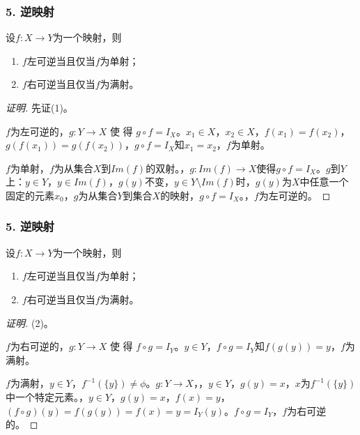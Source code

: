 \documentclass{beamer}
\begin{document}
\begin{CJK*}{UTF8}{gbsn}
\begin{frame}
  \frametitle{5. 逆映射}
  \begin{Thm}
    设$f:X\to Y$为一个映射，则
    \begin{enumerate}
    \item $f$左可逆当且仅当$f$为单射；
    \item $f$右可逆当且仅当$f$为满射。
    \end{enumerate}
  \end{Thm}\pause
  \begin{proof}[证明]\justifying\let\raggedright\justifying
  \pause  先证(1)。

$f$为左可逆的， $g:Y\to X$ 使 得 $g\circ f = I_X$。$x_1\in X$，$x_2\in X$，$f(x_1)=f(x_2)$，$g(f(x_1))=g(f(x_2))$，$g\circ f = I_{X}$知$x_1=x_2$，$f$为单射。

$f$为单射，$f$为从集合$X$到$Im(f)$的双射。，$g:Im(f)\to X$使得$g\circ f = I_X$。$g$到$Y$上：$y\in Y$，$y\in Im(f)$，$g(y)$不变，$y\in Y\setminus Im(f)$时，$g(y)$为$X$中任意一个固定的元素$x_0$，$g$为从集合$Y$到集合$X$的映射，$g\circ f = I_X$。，$f$为左可逆的。

  \end{proof}
\end{frame}
\begin{frame}
  \frametitle{5. 逆映射}
  \begin{Thm5.4}
    设$f:X\to Y$为一个映射，则
    \begin{enumerate}
    \item $f$左可逆当且仅当$f$为单射；
    \item $f$右可逆当且仅当$f$为满射。
    \end{enumerate}
  \end{Thm5.4}\pause
  \begin{proof}[证明]\justifying\let\raggedright\justifying
    (2)。

    $f$为右可逆的，$g:Y\to X$ 使 得 $f\circ g=I_Y$。$y\in Y$，$f\circ g = I_{Y}$知$f(g(y))=y$，$f$为满射。
    
    $f$为满射，$y\in Y$，\pause $f^{-1}(\{y\})\neq \phi$。$g:Y\to X$，，$y\in Y$，\pause $g(y)=x$，$x$为$f^{-1}(\{y\})$中一个特定元素。，$y\in Y$，$g(y)=x$，$f(x)=y$，$(f\circ g)(y) = f(g(y)) = f(x) = y = I_Y(y)$。$f\circ g=I_Y$，$f$为右可逆的。    
  \end{proof}
\end{frame}


\end{CJK*}
\end{document}

